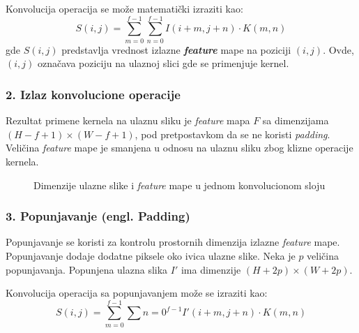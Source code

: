 \documentclass[12pt]{article}
\begin{document}
   Konvolucija operacija se može matematički izraziti kao:
   \[
   S(i, j) = \sum_{m=0}^{f-1} \sum_{n=0}^{f-1} I(i+m, j+n) \cdot K(m, n)
   \]
   gde \( S(i, j) \) predstavlja vrednost izlazne \textbf{\textit{feature}} mape na poziciji 
   \((i, j)\). Ovde, \( (i, j) \) označava poziciju na ulaznoj slici gde se primenjuje kernel.

   \subsubsection*{2. Izlaz konvolucione operacije}
   Rezultat primene kernela na ulaznu sliku je \textit{feature} mapa \( F \) 
   sa dimenzijama \((H - f + 1) \times (W - f + 1)\), pod pretpostavkom da se ne 
   koristi \textit{padding}. Veličina \textit{feature} mape je 
   smanjena u odnosu na ulaznu sliku zbog klizne operacije kernela.

   \newpage   

   \begin{figure}[h!]
      \centering
      \caption{Dimenzije ulazne slike i \textit{feature} mape u jednom konvolucionom sloju}
      \label{fig:convolution}
    \end{figure}

    \subsubsection*{3. Popunjavanje (engl. Padding)}

    Popunjavanje se koristi za kontrolu prostornih dimenzija izlazne \textit{feature} mape. 
    Popunjavanje dodaje dodatne piksele oko ivica ulazne slike. 
    Neka je \( p \) veličina popunjavanja. 
    Popunjena ulazna slika \( I' \) ima dimenzije \((H + 2p) \times (W + 2p)\).
    
    Konvolucija operacija sa popunjavanjem može se izraziti kao:
    \[
    S(i, j) = \sum_{m=0}^{f-1} \sum{n=0}^{f-1} I'(i+m, j+n) \cdot K(m, n)
    \]
\end{document}

